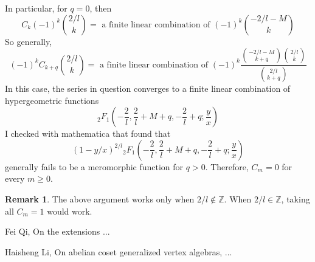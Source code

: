 \documentclass[11pt,oneside,reqno]{amsart}
\theoremstyle{definition}
\newtheorem{rema}[theorem]{Remark}
\newcommand{\Z}{{\mathbb Z}}
\begin{document}
In particular, for $q=0$, then 
$$C_{k}(-1)^{k} \binom{2/l}{k} = \text{ a finite linear combination of }(-1)^k \binom{-2/l-M}{k} $$
So generally, 
$$(-1)^k C_{k+q}\binom{2/l}{k} = \text{ a finite linear combination of } (-1)^k \displaystyle{\frac{\binom{-2/l-M}{k+q}\binom{2/l}{k}}{\binom{2/l}{k+q}}}$$
In this case, the series in question converges to a finite linear combination of hypergeometric functions 
$${}_2F_1\left(-\frac 2 l, \frac 2 l + M + q, - \frac 2 l + q; \frac y x\right)$$
I checked with mathematica that found that 
$$(1-y/x)^{2/l}{}_2F_1\left(-\frac 2 l, \frac 2 l + M + q, - \frac 2 l + q; \frac y x\right)$$
generally fails to be a meromorphic function for $q>0$. Therefore, $C_m = 0$ for every $m\geq 0$. 

\begin{rema}
    The above argument works only when $2/l\notin \Z$. When $2/l\in \Z$, taking all $C_m = 1$ would work. 
\end{rema}
\begin{thebibliography}{KWAK2}

 Fei Qi, On the extensions ...

 Haisheng Li, On abelian coset generalized vertex algebras, ...

\end{thebibliography}
\end{document}
